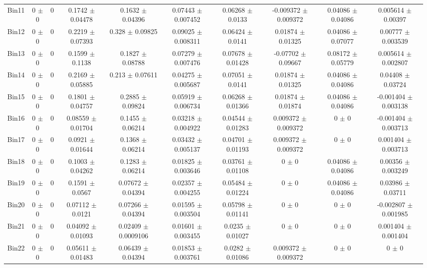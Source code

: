 \begin{tabular}{@{\extracolsep{4pt}}lccccccccc@{}}
     Bin11 & 0 $\pm$ 0 & 0 & 0.1742 $\pm$ 0.04478 & 0.1632 $\pm$ 0.04396 & 0.07443 $\pm$ 0.007452 & 0.06268 $\pm$ 0.0133 & -0.009372 $\pm$ 0.009372 & 0.04086 $\pm$ 0.04086 & 0.005614 $\pm$ 0.00397 \\ 
     Bin12 & 0 $\pm$ 0 & 0 & 0.2219 $\pm$ 0.07393 & 0.328 $\pm$ 0.09825 & 0.09025 $\pm$ 0.008311 & 0.06424 $\pm$ 0.0141 & 0.01874 $\pm$ 0.01325 & 0.04086 $\pm$ 0.07077 & 0.00777 $\pm$ 0.003539 \\ 
     Bin13 & 0 $\pm$ 0 & 0 & 0.1599 $\pm$ 0.1138 & 0.1827 $\pm$ 0.08788 & 0.07279 $\pm$ 0.007476 & 0.07678 $\pm$ 0.01428 & -0.07702 $\pm$ 0.09667 & 0.08172 $\pm$ 0.05779 & 0.005614 $\pm$ 0.002807 \\ 
     Bin14 & 0 $\pm$ 0 & 0 & 0.2169 $\pm$ 0.05885 & 0.213 $\pm$ 0.07611 & 0.04275 $\pm$ 0.005687 & 0.07051 $\pm$ 0.0141 & 0.01874 $\pm$ 0.01325 & 0.04086 $\pm$ 0.04086 & 0.04408 $\pm$ 0.03724 \\ 
     Bin15 & 0 $\pm$ 0 & 0 & 0.1801 $\pm$ 0.04757 & 0.2885 $\pm$ 0.09824 & 0.05919 $\pm$ 0.006734 & 0.06268 $\pm$ 0.01366 & 0.01874 $\pm$ 0.01874 & 0.04086 $\pm$ 0.04086 & -0.001404 $\pm$ 0.003138 \\ 
     Bin16 & 0 $\pm$ 0 & 0 & 0.08559 $\pm$ 0.01704 & 0.1455 $\pm$ 0.06214 & 0.03218 $\pm$ 0.004922 & 0.04544 $\pm$ 0.01283 & 0.009372 $\pm$ 0.009372 & 0 $\pm$ 0 & -0.001404 $\pm$ 0.003713 \\ 
     Bin17 & 0 $\pm$ 0 & 0 & 0.0921 $\pm$ 0.01644 & 0.1368 $\pm$ 0.06214 & 0.03432 $\pm$ 0.005137 & 0.04701 $\pm$ 0.01193 & 0.009372 $\pm$ 0.009372 & 0 $\pm$ 0 & 0.001404 $\pm$ 0.003713 \\ 
     Bin18 & 0 $\pm$ 0 & 0 & 0.1003 $\pm$ 0.04262 & 0.1283 $\pm$ 0.06214 & 0.01825 $\pm$ 0.003646 & 0.03761 $\pm$ 0.01108 & 0 $\pm$ 0 & 0.04086 $\pm$ 0.04086 & 0.00356 $\pm$ 0.003249 \\ 
     Bin19 & 0 $\pm$ 0 & 0 & 0.1591 $\pm$ 0.0567 & 0.07672 $\pm$ 0.04394 & 0.02357 $\pm$ 0.004255 & 0.05484 $\pm$ 0.01224 & 0 $\pm$ 0 & 0.04086 $\pm$ 0.04086 & 0.03986 $\pm$ 0.03711 \\ 
     Bin20 & 0 $\pm$ 0 & 0 & 0.07112 $\pm$ 0.0121 & 0.07266 $\pm$ 0.04394 & 0.01595 $\pm$ 0.003504 & 0.05798 $\pm$ 0.01141 & 0 $\pm$ 0 & 0 $\pm$ 0 & -0.002807 $\pm$ 0.001985 \\ 
     Bin21 & 0 $\pm$ 0 & 0 & 0.04092 $\pm$ 0.01093 & 0.02409 $\pm$ 0.0009106 & 0.01601 $\pm$ 0.003455 & 0.0235 $\pm$ 0.01027 & 0 $\pm$ 0 & 0 $\pm$ 0 & 0.001404 $\pm$ 0.001404 \\ 
     Bin22 & 0 $\pm$ 0 & 0 & 0.05611 $\pm$ 0.01483 & 0.06439 $\pm$ 0.04394 & 0.01853 $\pm$ 0.003761 & 0.0282 $\pm$ 0.01086 & 0.009372 $\pm$ 0.009372 & 0 $\pm$ 0 & 0 $\pm$ 0 \\ 

\end{tabular}
